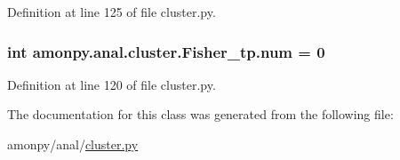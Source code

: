 Definition at line 125 of file cluster.\-py.

\hypertarget{classamonpy_1_1anal_1_1cluster_1_1_fisher__tp_a3eff8425c58f4b61a8bff758141bfc3e}{
\subsubsection[{num}]{\setlength{\rightskip}{0pt plus 5cm}int amonpy.\-anal.\-cluster.\-Fisher\-\_\-tp.\-num = 0\hspace{0.3cm}{\ttfamily [static]}}}\label{classamonpy_1_1anal_1_1cluster_1_1_fisher__tp_a3eff8425c58f4b61a8bff758141bfc3e}


Definition at line 120 of file cluster.\-py.



The documentation for this class was generated from the following file\-:\begin{DoxyCompactItemize}
\item 
amonpy/anal/\hyperlink{cluster_8py}{cluster.\-py}\end{DoxyCompactItemize}
